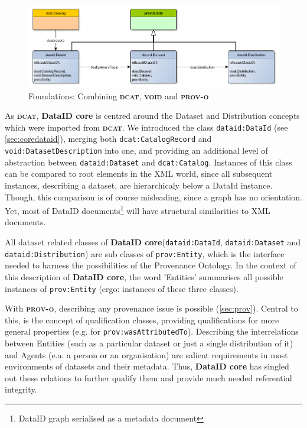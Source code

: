 \documentclass[a4paper,english,twoside,BCOR1.5cm,headsepline,DIV12,appendixprefix,final,12pt]{scrbook}
\newcommand{\core}{{\ttfamily\bfseries DataID core}\xspace}
\newcommand{\prov}{{\scshape\bfseries prov-o}\xspace}
\newcommand{\void}{{\scshape\bfseries void}\xspace}
\newcommand{\dcat}{{\scshape\bfseries dcat}\xspace}
\newcommand{\prop}[1]{{{\texttt{#1}}}}
\begin{document}
\begin{figure}[!htbp]
\centering
  \includegraphics[width=\textwidth]{images/FoundationalConcept.png}
  \caption{Foundations: Combining \dcat, \void and \prov}
  \label{fig:foundations}
\end{figure}

As \dcat, \core is centred around the Dataset and Distribution concepts which were imported from \dcat. We introduced the class \prop{dataid:DataId} (see \cref{sec:coredataid}), merging both \prop{dcat:CatalogRecord} and \prop{void:DatasetDescription} into one, and providing an additional level of abstraction between \prop{dataid:Dataset} and \prop{dcat:Catalog}. Instances of this class can be compared to root elements in the XML world, since all subsequent instances, describing a dataset, are hierarchicaly below a DataId instance. Though, this comparison is of course misleading, since a graph has no orientation. Yet, most of DataID documents\footnote{DataID graph serialised as a metadata document} will have structural similarities to XML documents.

All dataset related classes of \core (\prop{dataid:DataId}, \prop{dataid:Dataset} and \prop{dataid:Distribution}) are sub classes of \prop{prov:Entity}, which is the interface needed to harness the possibilities of the Provenance Ontology. In the context of this description of \core, the word 'Entities' summarises all possible instances of \prop{prov:Entity} (ergo: instances of these three classes).

With \prov, describing any provenance issue is possible (\cref{sec:prov}). Central to this, is the concept of qualification classes, providing qualifications for more general properties (e.g. for \prop{prov:wasAttributedTo}). Describing the interrelations between Entities (such as a particular dataset or just a single distribution of it) and Agents (e.a. a person or an organisation) are salient requirements in most environments of datasets and their metadata. Thus, \core has singled out these relations to further qualify them and provide much needed referential integrity.
\end{document}
